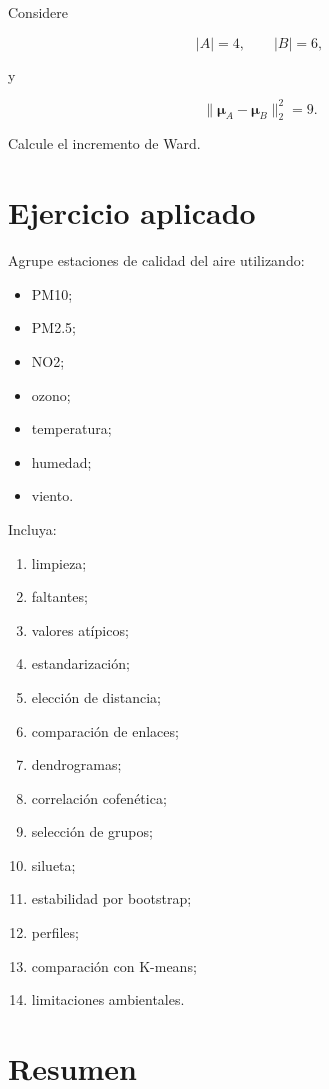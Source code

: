 \documentclass[
  spanish,
  10.5pt,
  letterpaper,
  DIV=11,
  numbers=noendperiod,
  oneside,
  open=any]{scrreprt}
\providecommand{\tightlist}{%
  \setlength{\itemsep}{0pt}\setlength{\parskip}{0pt}}
\theoremstyle{definition}
\theoremstyle{definition}
\theoremstyle{plain}
\theoremstyle{remark}
\begin{document}
Considere

\[
|A|=4,
\qquad
|B|=6,
\]

y

\[
\|\boldsymbol{\mu}_A-\boldsymbol{\mu}_B\|_2^2=9.
\]

Calcule el incremento de Ward.

\section*{Ejercicio aplicado}\label{ejercicio-aplicado-15}


Agrupe estaciones de calidad del aire utilizando:

\begin{itemize}
\tightlist
\item
  PM10;
\item
  PM2.5;
\item
  NO2;
\item
  ozono;
\item
  temperatura;
\item
  humedad;
\item
  viento.
\end{itemize}

Incluya:

\begin{enumerate}
\def\labelenumi{\arabic{enumi}.}
\tightlist
\item
  limpieza;
\item
  faltantes;
\item
  valores atípicos;
\item
  estandarización;
\item
  elección de distancia;
\item
  comparación de enlaces;
\item
  dendrogramas;
\item
  correlación cofenética;
\item
  selección de grupos;
\item
  silueta;
\item
  estabilidad por bootstrap;
\item
  perfiles;
\item
  comparación con K-means;
\item
  limitaciones ambientales.
\end{enumerate}

\section*{Resumen}\label{resumen-17}
\end{document}
